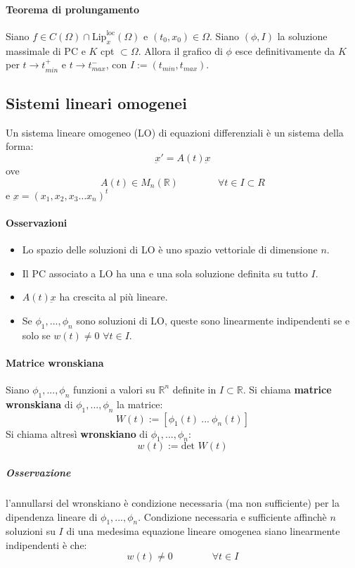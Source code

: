 \documentclass[a4paper,12pt]{article}
\begin{document}
\paragraph{Teorema di prolungamento}
Siano  $f \in C\left(\Omega\right) \cap \text{Lip}^{\text{loc}}_x\left(\Omega\right)$ e $\left(t_0,x_0\right) \in \Omega$. Siano $\left(\phi,I\right)$ la soluzione massimale di PC e $K$ cpt $\subset \Omega$. Allora il grafico di $\phi$ esce definitivamente da $K$ per $t\rightarrow t^+_{min}$ e $t\rightarrow t^-_{max}$, con $I:=(t_{min},t_{max})$.



\subsection{Sistemi lineari omogenei}
Un sistema lineare omogeneo (LO) di equazioni differenziali è un sistema della forma:
$$\underbar{x}' = A(t)\underbar{x}$$ 
ove $$A(t)\in M_n(\mathbb{R})\qquad \qquad \forall t\in I\subset R$$ e $\underbar{x} = (x_1,x_2,x_3 \dots x_n)^t$
\paragraph{Osservazioni}
\begin{itemize}
 \item Lo spazio delle soluzioni di LO è uno spazio vettoriale di dimensione $n$.
 \item Il PC associato a LO ha una e una sola soluzione definita su tutto $I$.
 \item $A(t)\underbar{x}$ ha crescita al più lineare.
 \item Se $\phi_1,...,\phi_n$ sono soluzioni di LO, queste sono linearmente indipendenti se e solo se $w(t)\neq0$ $\forall t \in I$.
\end{itemize}


\paragraph{Matrice wronskiana}
Siano $\phi_1,...,\phi_n$ funzioni a valori su $\mathbb{R}^n$ definite in $I\subset \mathbb{R}$.
Si chiama \textbf{matrice wronskiana} di $\phi_1,...,\phi_n$ la matrice:
$$W(t):=[\phi_1(t)\ ...\ \phi_n(t)]$$
Si chiama altresì \textbf{wronskiano} di $\phi_1,...,\phi_n$:
$$w(t):=\text{det } W(t)$$
\subparagraph*{Osservazione} l'annullarsi del wronskiano è condizione necessaria (ma non sufficiente) per la dipendenza lineare di $\phi_1,...,\phi_n$. 
Condizione necessaria e sufficiente affinchè $n$ soluzioni su $I$ di una medesima equazione lineare omogenea siano linearmente indipendenti è che:
$$ w(t)\neq0 \qquad\qquad \forall t \in I$$
\end{document}
